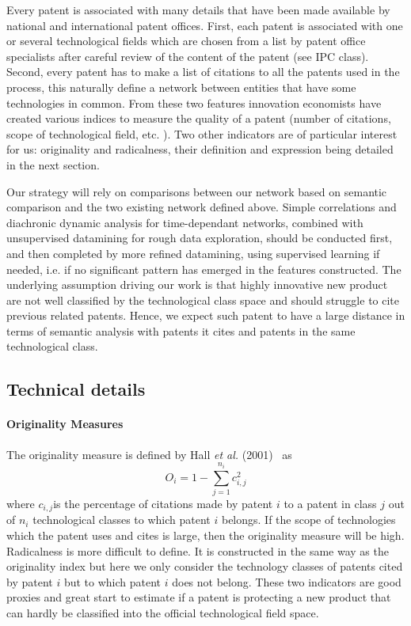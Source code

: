 Every patent is associated with many details that have been made available by national and international patent offices. First, each patent is associated with one or several technological fields which are chosen from a list by patent office specialists after careful review of the content of the patent (see IPC class). Second, every patent has to make a list of citations to all the patents used in the process, this naturally define a network between entities that have some technologies in common. From these two features innovation economists have created various indices to measure the quality of a patent (number of citations, scope of technological field, etc. ). Two other indicators are of particular interest for us: originality and radicalness, their definition and expression being detailed in the next section.

Our strategy will rely on comparisons between our network based on semantic comparison and the two existing network defined above. Simple correlations and diachronic dynamic analysis for time-dependant networks, combined with unsupervised datamining for rough data exploration, should be conducted first, and then completed by more refined datamining, using supervised learning if needed, i.e. if no significant pattern has emerged in the features constructed.
The underlying assumption driving our work is that highly innovative new product are not well classified by the technological class space and should struggle to cite previous related patents. %
Hence, we expect such patent to have a large distance in terms of semantic analysis with patents it cites and patents in the same technological class.


\subsection{Technical details}


\paragraph{Originality Measures}

The originality measure is
defined by Hall \textit{et al.} (2001)~\cite{Hall2001} as
\[
O_{i}=1-\sum_{j=1}^{n_{i}}{c_{i,j}^{2}}
\]
where $c_{i,j}$is the percentage of citations made by patent $i$ to a patent in class $j$ out of
$n_{i}$ technological classes to which patent $i$ belongs. If the scope of
technologies which the patent uses and cites is large, then the originality
measure will be high. Radicalness is more difficult to define. It is
constructed in the same way as the originality index but here we only consider
the technology classes of patents cited by patent $i$ but to which patent $i$
does not belong. These two indicators are good proxies and great start to estimate if a patent is protecting a new product that can hardly be classified into the official technological field space.



